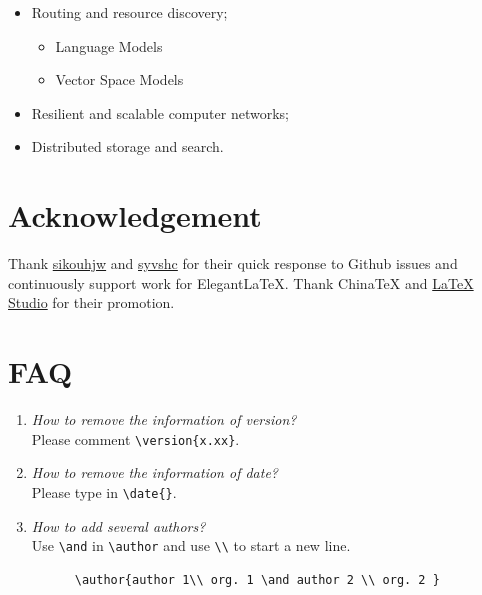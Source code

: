 \documentclass[en,hazy,screen,blue,14pt]{elegantnote}
\begin{document}
\begin{itemize}[noitemsep]
  \item Routing and resource discovery;
    \begin{itemize} 
      \item Language Models
      \item Vector Space Models
    \end{itemize}
  \item Resilient and scalable computer networks;
  \item Distributed storage and search.
\end{itemize}


\section{Acknowledgement}

Thank \href{https://github.com/sikouhjw}{sikouhjw} and \href{https://github.com/syvshc}{syvshc} for their quick response to Github issues and continuously support work for ElegantLaTeX. Thank ChinaTeX and \href{http://www.latexstudio.net/}{LaTeX Studio} for their promotion. 


\section{FAQ}

\begin{enumerate}[label=\arabic*).]
	\item \textit{How to remove the information of version?}\\
    Please comment \lstinline|\version{x.xx}|.
	\item \textit{How to remove the information of date?}\\
	  Please type in \lstinline|\date{}|.
	\item \textit{How to add several authors?}\\
	  Use \lstinline{\and} in \lstinline{\author} and use \lstinline{\\} to start a new line.
    \begin{lstlisting}
      \author{author 1\\ org. 1 \and author 2 \\ org. 2 }
    \end{lstlisting}
\end{enumerate}


\end{document}
